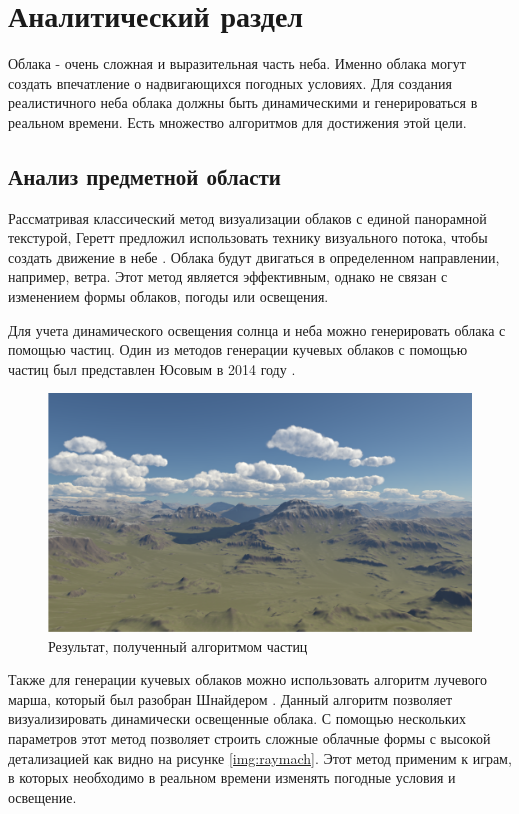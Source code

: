 \chapter{Аналитический раздел}
\label{cha:analysis}

Облака - очень сложная и выразительная часть неба. Именно облака могут создать впечатление
о надвигающихся погодных условиях.
Для создания реалистичного неба облака должны быть динамическими
и генерироваться в реальном времени. Есть множество алгоритмов для достижения этой цели.

\section{Анализ предметной области}

Рассматривая классический метод визуализации облаков с единой панорамной текстурой, Геретт предложил 
использовать технику визуального потока, чтобы создать движение в небе \cite{Gue14}. Облака будут двигаться в определенном направлении, например, ветра. Этот метод является
эффективным, однако не связан с изменением формы облаков, погоды или
освещения.

Для учета динамического освещения солнца и неба можно генерировать облака
с помощью частиц. Один из методов генерации кучевых облаков с помощью
частиц был представлен Юсовым в 2014 году \cite{hpg.20141101}.

\begin{figure}[H]
    \centering
    \includegraphics[scale=0.4]{img/ysov.png}
    \caption{Результат, полученный алгоритмом частиц}
    \label{img:ysov}
\end{figure}

Также для генерации кучевых облаков можно использовать алгоритм лучевого
марша, который был разобран Шнайдером \cite{Sch16}. Данный алгоритм
позволяет визуализировать динамически освещенные облака. С помощью
нескольких параметров этот метод позволяет строить сложные облачные
формы с высокой детализацией как видно на рисунке \ref{img:raymach}.
Этот метод применим к играм, в которых необходимо в реальном времени
изменять погодные условия и освещение.

